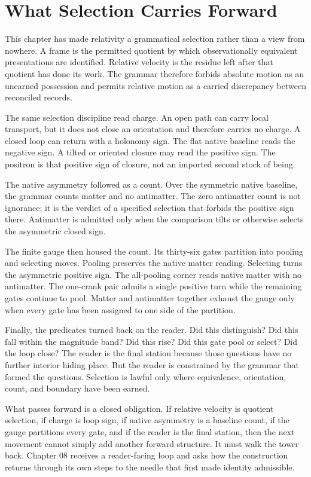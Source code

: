 \section{What Selection Carries Forward}

This chapter has made relativity a grammatical selection rather than a view
from nowhere. A frame is the permitted quotient by which observationally
equivalent presentations are identified. Relative velocity is the residue
left after that quotient has done its work. The grammar therefore forbids
absolute motion as an unearned possession and permits relative motion as a
carried discrepancy between reconciled records.

The same selection discipline read charge. An open path can carry local
transport, but it does not close an orientation and therefore carries no
charge. A closed loop can return with a holonomy sign. The flat native
baseline reads the negative sign. A tilted or oriented closure may read the
positive sign. The positron is that positive sign of closure, not an
imported second stock of being.

The native asymmetry followed as a count. Over the symmetric native
baseline, the grammar counts matter and no antimatter. The zero antimatter
count is not ignorance; it is the verdict of a specified selection that
forbids the positive sign there. Antimatter is admitted only when the
comparison tilts or otherwise selects the asymmetric closed sign.

The finite gauge then housed the count. Its thirty-six gates partition into
pooling and selecting moves. Pooling preserves the native matter reading.
Selecting turns the asymmetric positive sign. The all-pooling corner reads
native matter with no antimatter. The one-crank pair admits a single
positive turn while the remaining gates continue to pool. Matter and
antimatter together exhaust the gauge only when every gate has been assigned
to one side of the partition.

Finally, the predicates turned back on the reader. Did this distinguish? Did
this fall within the magnitude band? Did this rise? Did this gate pool or
select? Did the loop close? The reader is the final station because those
questions have no further interior hiding place. But the reader is
constrained by the grammar that formed the questions. Selection is lawful
only where equivalence, orientation, count, and boundary have been earned.

What passes forward is a closed obligation. If relative velocity is quotient
selection, if charge is loop sign, if native asymmetry is a baseline count,
if the gauge partitions every gate, and if the reader is the final station,
then the next movement cannot simply add another forward structure. It must
walk the tower back. Chapter 08 receives a reader-facing loop and asks how
the construction returns through its own steps to the needle that first made
identity admissible.
